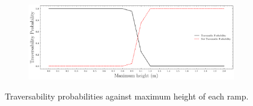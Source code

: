 \begin{figure}[htbp]
    \centering
    \begin{subfigure}[b]{1\linewidth}
    \includegraphics[width=\linewidth]{../img/5/custom_patches/ramp/predictions.png}
    \end{subfigure}
    \caption{Traversability probabilities against maximum height of each ramp.}
    \label{fig: ramps-preds}
\end{figure}
